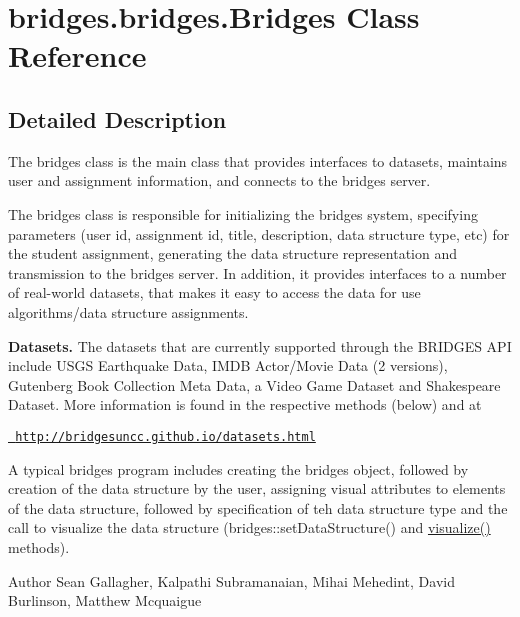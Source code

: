 \hypertarget{classbridges_1_1bridges_1_1_bridges}{}\section{bridges.\+bridges.\+Bridges Class Reference}
\label{classbridges_1_1bridges_1_1_bridges}


\subsection{Detailed Description}
The bridges class is the main class that provides interfaces to datasets, maintains user and assignment information, and connects to the bridges server. 

The bridges class is responsible for initializing the bridges system, specifying parameters (user id, assignment id, title, description, data structure type, etc) for the student assignment, generating the data structure representation and transmission to the bridges server. In addition, it provides interfaces to a number of real-\/world datasets, that makes it easy to access the data for use algorithms/data structure assignments. ~\newline


{\bfseries{Datasets.}} The datasets that are currently supported through the B\+R\+I\+D\+G\+ES A\+PI include U\+S\+GS Earthquake Data, I\+M\+DB Actor/\+Movie Data (2 versions), Gutenberg Book Collection Meta Data, a Video Game Dataset and Shakespeare Dataset. More information is found in the respective methods (below) and at 

\href{http://bridgesuncc.github.io/datasets.html}{\texttt{ http\+://bridgesuncc.\+github.\+io/datasets.\+html}} 

A typical bridges program includes creating the bridges object, followed by creation of the data structure by the user, assigning visual attributes to elements of the data structure, followed by specification of teh data structure type and the call to visualize the data structure (bridges\+::set\+Data\+Structure() and \mbox{\hyperlink{classbridges_1_1bridges_1_1_bridges_a822a7338e4dce27f7d8d0d322bdace08}{visualize()}} methods).

\begin{DoxyAuthor}{Author}
Sean Gallagher, Kalpathi Subramanaian, Mihai Mehedint, David Burlinson, Matthew Mcquaigue 
\end{DoxyAuthor}
